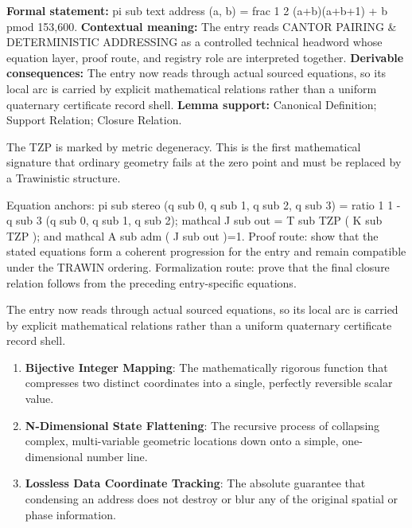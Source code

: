 \begingroup\footnotesize\setlength{\emergencystretch}{3em}\sloppy
\textbf{Formal statement:} pi sub text address (a, b) = frac 1 2 (a+b)(a+b+1) + b pmod 153,600. \textbf{Contextual meaning:} The entry reads CANTOR PAIRING \& DETERMINISTIC ADDRESSING as a controlled technical headword whose equation layer, proof route, and registry role are interpreted together. \textbf{Derivable consequences:} The entry now reads through actual sourced equations, so its local arc is carried by explicit mathematical relations rather than a uniform quaternary certificate record shell. \textbf{Lemma support:} Canonical Definition; Support Relation; Closure Relation.\par
\endgroup

The TZP is marked by metric degeneracy. This is the first mathematical signature that ordinary geometry fails at the zero point and must be replaced by a Trawinistic structure.

Equation anchors: pi sub stereo (q sub 0, q sub 1, q sub 2, q sub 3) = ratio 1 1 - q sub 3 (q sub 0, q sub 1, q sub 2); mathcal J sub out = T sub TZP ( K sub TZP ); and mathcal A sub adm ( J sub out )=1. Proof route: show that the stated equations form a coherent progression for the entry and remain compatible under the TRAWIN ordering. Formalization route: prove that the final closure relation follows from the preceding entry-specific equations.

The entry now reads through actual sourced equations, so its local arc is carried by explicit mathematical relations rather than a uniform quaternary certificate record shell.
\endgroup

\begin{enumerate}[leftmargin=1.6em,itemsep=6pt,topsep=4pt]
\item \textbf{Bijective Integer Mapping}: The mathematically rigorous function that compresses two distinct coordinates into a single, perfectly reversible scalar value.
\item \textbf{N-Dimensional State Flattening}: The recursive process of collapsing complex, multi-variable geometric locations down onto a simple, one-dimensional number line.
\item \textbf{Lossless Data Coordinate Tracking}: The absolute guarantee that condensing an address does not destroy or blur any of the original spatial or phase information.
\end{enumerate}

